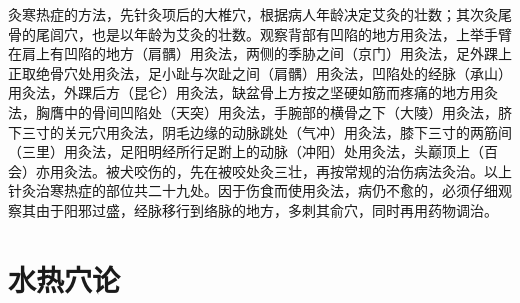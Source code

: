 \documentclass[12pt,UTF8]{ctexbook}
\begin{document}
灸寒热症的方法，先针灸项后的大椎穴，根据病人年龄决定艾灸的壮数；其次灸尾骨的尾闾穴，也是以年龄为艾灸的壮数。观察背部有凹陷的地方用灸法，上举手臂在肩上有凹陷的地方（肩髃）用灸法，两侧的季胁之间（京门）用灸法，足外踝上正取绝骨穴处用灸法，足小趾与次趾之间（肩髃）用灸法，凹陷处的经脉（承山）用灸法，外踝后方（昆仑）用灸法，缺盆骨上方按之坚硬如筋而疼痛的地方用灸法，胸膺中的骨间凹陷处（天突）用灸法，手腕部的横骨之下（大陵）用灸法，脐下三寸的关元穴用灸法，阴毛边缘的动脉跳处（气冲）用灸法，膝下三寸的两筋间（三里）用灸法，足阳明经所行足跗上的动脉（冲阳）处用灸法，头巅顶上（百会）亦用灸法。被犬咬伤的，先在被咬处灸三壮，再按常规的治伤病法灸治。以上针灸治寒热症的部位共二十九处。因于伤食而使用灸法，病仍不愈的，必须仔细观察其由于阳邪过盛，经脉移行到络脉的地方，多刺其俞穴，同时再用药物调治。

\chapter{水热穴论}
\end{document}
